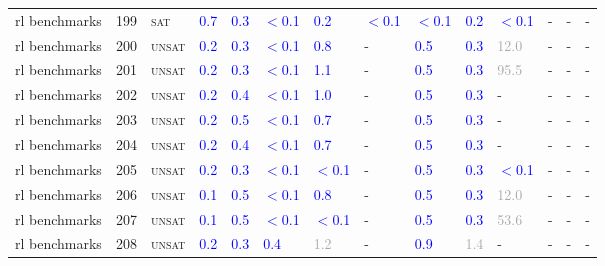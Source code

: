\begin{center}
{\begin{longtable}{@{}llllllllllllll@{}}
rl benchmarks & 199 & \textsc{sat} & \textcolor{blue}{0.7} & \textcolor{blue}{0.3} & \textcolor{blue}{$<$0.1} & \textcolor{blue}{0.2} & \textcolor{blue}{$<$0.1} & \textcolor{blue}{$<$0.1} & \textcolor{blue}{0.2} & \textcolor{blue}{$<$0.1} & - & - & - \\
rl benchmarks & 200 & \textsc{unsat} & \textcolor{blue}{0.2} & \textcolor{blue}{0.3} & \textcolor{blue}{$<$0.1} & \textcolor{blue}{0.8} & - & \textcolor{blue}{0.5} & \textcolor{blue}{0.3} & \textcolor{darkgray}{12.0} & - & - & - \\
rl benchmarks & 201 & \textsc{unsat} & \textcolor{blue}{0.2} & \textcolor{blue}{0.3} & \textcolor{blue}{$<$0.1} & \textcolor{blue}{1.1} & - & \textcolor{blue}{0.5} & \textcolor{blue}{0.3} & \textcolor{darkgray}{95.5} & - & - & - \\
rl benchmarks & 202 & \textsc{unsat} & \textcolor{blue}{0.2} & \textcolor{blue}{0.4} & \textcolor{blue}{$<$0.1} & \textcolor{blue}{1.0} & - & \textcolor{blue}{0.5} & \textcolor{blue}{0.3} & - & - & - & - \\
rl benchmarks & 203 & \textsc{unsat} & \textcolor{blue}{0.2} & \textcolor{blue}{0.5} & \textcolor{blue}{$<$0.1} & \textcolor{blue}{0.7} & - & \textcolor{blue}{0.5} & \textcolor{blue}{0.3} & - & - & - & - \\
rl benchmarks & 204 & \textsc{unsat} & \textcolor{blue}{0.2} & \textcolor{blue}{0.4} & \textcolor{blue}{$<$0.1} & \textcolor{blue}{0.7} & - & \textcolor{blue}{0.5} & \textcolor{blue}{0.3} & - & - & - & - \\
rl benchmarks & 205 & \textsc{unsat} & \textcolor{blue}{0.2} & \textcolor{blue}{0.3} & \textcolor{blue}{$<$0.1} & \textcolor{blue}{$<$0.1} & - & \textcolor{blue}{0.5} & \textcolor{blue}{0.3} & \textcolor{blue}{$<$0.1} & - & - & - \\
rl benchmarks & 206 & \textsc{unsat} & \textcolor{blue}{0.1} & \textcolor{blue}{0.5} & \textcolor{blue}{$<$0.1} & \textcolor{blue}{0.8} & - & \textcolor{blue}{0.5} & \textcolor{blue}{0.3} & \textcolor{darkgray}{12.0} & - & - & - \\
rl benchmarks & 207 & \textsc{unsat} & \textcolor{blue}{0.1} & \textcolor{blue}{0.5} & \textcolor{blue}{$<$0.1} & \textcolor{blue}{$<$0.1} & - & \textcolor{blue}{0.5} & \textcolor{blue}{0.3} & \textcolor{darkgray}{53.6} & - & - & - \\
rl benchmarks & 208 & \textsc{unsat} & \textcolor{blue}{0.2} & \textcolor{blue}{0.3} & \textcolor{blue}{0.4} & \textcolor{darkgray}{1.2} & - & \textcolor{blue}{0.9} & \textcolor{darkgray}{1.4} & - & - & - & - \\

\end{longtable}}
\end{center}
